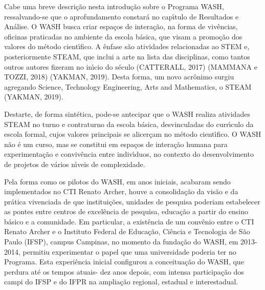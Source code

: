 \documentclass[
12pt,		%
openright,	%
twoside,  %
a4paper,			%
chapter=TITLE,		%
english,			%
french,				%
spanish,			%
brazil				%
]{USPSC-classe/USPSC}
\begin{document}
Cabe uma breve descri\c{c}\~ao nesta introdu\c{c}\~ao sobre o Programa WASH, ressalvando-se que o aprofundamento constar\'a no cap\'{\i}tulo de Resultados e An\'alise. O WASH busca criar espa\c{c}os de intera\c{c}\~ao, na forma de  viv\^encias, oficinas praticadas no ambiente da escola b\'asica, que visam a promo\c{c}\~ao dos valores do m\'etodo cient\'{\i}fico. A \^enfase s\~ao atividades relacionadas ao STEM e, posteriormente STEAM, que inclui a arte na lista das disciplinas, como tantos outros autores fizeram no in\'{\i}cio do s\'eculo (CATTERALL, 2017) (MAMMANA e TOZZI, 2018)  (YAKMAN, 2019). Desta forma, um novo acr\^onimo surgiu agregando Science, Technology Engineering, Arts and Mathematics, o STEAM (YAKMAN, 2019).

















Destarte, de forma sint\'etica, pode-se antecipar que o WASH realiza atividades STEAM no turno e contraturno da escola b\'asica, desvinculadas do curr\'{\i}culo da escola formal, cujos valores principais se alicer\c{c}am no m\'etodo cient\'{\i}fico. O WASH n\~ao \'e um curso, mas se constitui em espa\c{c}os de intera\c{c}\~ao humana para experimenta\c{c}\~ao e conviv\^encia entre indiv\'{\i}duos, no contexto do desenvolvimento de projetos de v\'arios n\'{\i}veis de complexidade.

















Pela forma como os pilotos do WASH, em anos iniciais, acabaram sendo implementados no  CTI Renato Archer, houve a consolida\c{c}\~ao da vis\~ao e da pr\'atica vivenciada de que institui\c{c}\~oes, unidades de pesquisa poderiam estabelecer as pontes entre centros de excel\^encia de pesquisa, educa\c{c}\~ao a partir do ensino b\'asico e a comunidade. Em particular, a exist\^encia de um conv\^enio entre o CTI Renato Archer e o Instituto Federal de Educa\c{c}\~ao, Ci\^encia e Tecnologia de S\~ao Paulo (IFSP), campus Campinas, no momento da funda\c{c}\~ao do WASH, em 2013-2014, permitiu experimentar o papel que uma universidade poderia ter no Programa. Esta experi\^encia inicial configurou a conceitua\c{c}\~ao do WASH, que perdura at\'e os tempos atuais- dez anos depois, com intensa participa\c{c}\~ao dos campi do IFSP e do IFPR na amplia\c{c}\~ao regional, estadual e interestadual.
\end{document}
